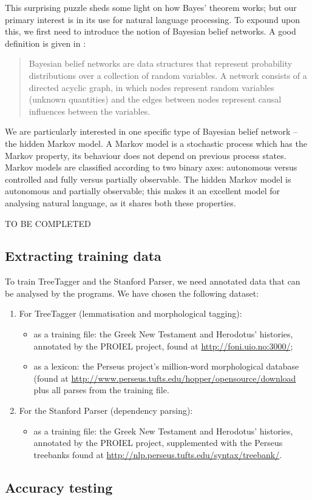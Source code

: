 This surprising puzzle sheds some light on how Bayes' theorem works; but our
primary interest is in its use for natural language processing. To expound upon
this, we first need to introduce the notion of Bayesian belief networks. A good definition is given in \citet[80]{bod2004}:

\begin{quote}
Bayesian belief networks are data structures that represent probability
distributions over a collection of random variables. A network consists of a
directed acyclic graph, in which nodes represent random variables (unknown
quantities) and the edges between nodes represent causal influences between the
variables.
\end{quote}

We are particularly interested in one specific type of Bayesian belief network
-- the hidden Markov model. A Markov model is a stochastic process which has
the Markov property, \ie its behaviour does not depend on previous process
states. Markov models are classified according to two binary axes: autonomous
versus controlled and fully versus partially observable. The hidden Markov
model is autonomous and partially observable; this makes it an excellent model
for analysing natural language, as it shares both these properties.\

TO BE COMPLETED

\subsection{Extracting training data} %
\label{sub:extract_training_data}
To train TreeTagger and the Stanford Parser, we need annotated data that can be analysed by the programs. We have chosen the following dataset:

\begin{enumerate}
  \item For TreeTagger (lemmatisation and morphological tagging):
\begin{itemize}
  \item as a training file: the Greek New Testament and Herodotus' histories, annotated by the PROIEL project, found at \url{http://foni.uio.no:3000/};
  \item as a lexicon: the Perseus project's million-word morphological database (found at \url{http://www.perseus.tufts.edu/hopper/opensource/download} plus all parses from the training file.
\end{itemize}

\item For the Stanford Parser (dependency parsing):
\begin{itemize}
  \item as a training file: the Greek New Testament and Herodotus' histories, annotated by the PROIEL project, supplemented with the Perseus treebanks found at \url{http://nlp.perseus.tufts.edu/syntax/treebank/}.
\end{itemize}
\end{enumerate}

\subsection{Accuracy testing} %
\label{sub:accuracy-testing}



